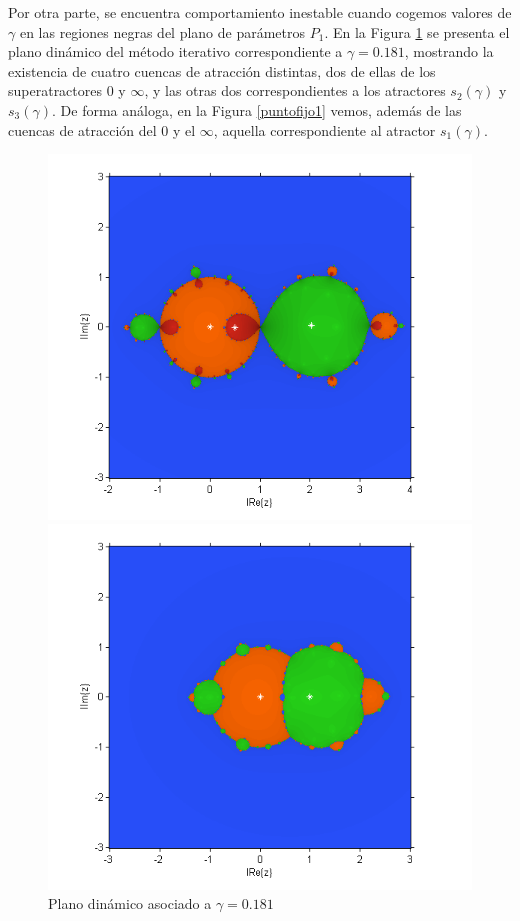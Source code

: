 Por otra parte, se encuentra comportamiento inestable cuando cogemos valores de $\gamma$ en las regiones negras del plano de parámetros $P_1$. En la Figura \ref{dospuntosfijos} se presenta el plano dinámico del método iterativo correspondiente a $\gamma=0.181$, mostrando la existencia de cuatro cuencas de atracción distintas, dos de ellas de los superatractores $0$ y $\infty$, y las otras dos correspondientes a los atractores $s_{2}(\gamma)$ y $s_{3}(\gamma)$. De forma análoga, en la Figura \ref{puntofijo1} vemos, además de las cuencas de atracción del $0$ y el $\infty$, aquella correspondiente al atractor $s_{1}(\gamma)$.

\begin{figure}[h!!!]
	\begin{minipage}[m]{0.5\linewidth}%
		\centering \includegraphics[width=\linewidth]{dospuntosfijos.png}
		\caption{Plano dinámico asociado a $\gamma=0.181$}\label{dospuntosfijos}
	\end{minipage}
	\begin{minipage}[m]{0.5\linewidth}%
		\centering \includegraphics[width=\linewidth]{puntofijo1.png}

\end{minipage}
\end{figure}
